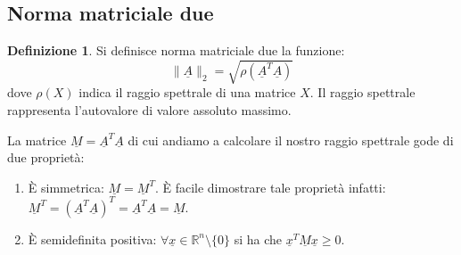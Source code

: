 \documentclass[12pt, a4paper]{book}
\theoremstyle{definition}
\newtheorem{defn}{Definizione}[section]
\newcommand{\VarMtrx}[1]{\ensuremath{\underline{#1}}}
\begin{document}
\subsection{Norma matriciale due}
\begin{flushleft}
\begin{defn}
Si definisce norma matriciale due la funzione:
\[ \lVert\VarMtrx{A}\rVert_{2} = \sqrt{\rho(\VarMtrx{A}^{T}\VarMtrx{A})} \]
dove $\rho(X)$ indica il raggio spettrale di una matrice $X$. Il raggio spettrale rappresenta l'autovalore di valore assoluto massimo. 
\end{defn}

La matrice $\VarMtrx{M}=\VarMtrx{A}^{T}\VarMtrx{A}$ di cui andiamo a calcolare il nostro raggio spettrale gode di due proprietà: 
\begin{enumerate}
	\item È simmetrica: $\VarMtrx{M} = \VarMtrx{M}^{T}$.  È facile dimostrare tale proprietà infatti: $\VarMtrx{M}^{T} = (\VarMtrx{A}^{T}\VarMtrx{A})^{T} = \VarMtrx{A}^{T}\VarMtrx{A} = \VarMtrx{M} $. 
	\item È semidefinita positiva: $\forall \VarMtrx{x} \in \mathbb{R}^{n} \setminus \{0\}$ si ha che $\VarMtrx{x}^{T}\VarMtrx{M}\VarMtrx{x} \geq 0$.
\end{enumerate}
\end{flushleft}
\end{document}
